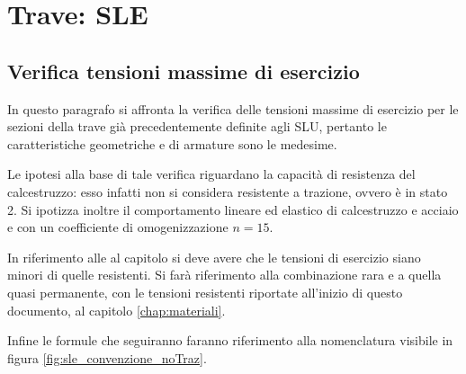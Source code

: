 \chapter{Trave: SLE}
\section{Verifica tensioni massime di esercizio}
In questo paragrafo si affronta la verifica delle tensioni massime di esercizio per le sezioni della trave già precedentemente definite agli SLU, pertanto le caratteristiche geometriche e di armature sono le medesime.

Le ipotesi alla base di tale verifica riguardano la capacità di resistenza del calcestruzzo: esso infatti non si considera resistente a trazione, ovvero è in stato 2.
Si ipotizza inoltre il comportamento lineare ed elastico di calcestruzzo e acciaio e con un coefficiente di omogenizzazione $n = 15$.

In riferimento alle  al capitolo  si deve avere che le tensioni di esercizio siano minori di quelle resistenti.
Si farà riferimento alla combinazione rara e a quella quasi permanente, con le tensioni resistenti riportate all'inizio di questo documento, al capitolo \ref{chap:materiali}.

Infine le formule che seguiranno faranno riferimento alla nomenclatura visibile in figura \ref{fig:sle_convenzione_noTraz}.

